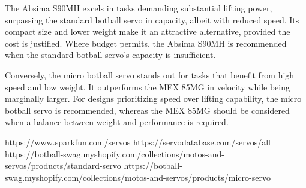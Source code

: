 \documentclass[conference]{IEEEtran}
\begin{document}
The Absima S90MH excels in tasks demanding substantial lifting power, surpassing the standard botball servo in capacity, albeit with reduced speed. Its compact size and lower weight make it an attractive alternative, provided the cost is justified. Where budget permits, the Absima S90MH is recommended when the standard botball servo's capacity is insufficient.

Conversely, the micro botball servo stands out for tasks that benefit from high speed and low weight. It outperforms the MEX 85MG in velocity while being marginally larger. For designs prioritizing speed over lifting capability, the micro botball servo is recommended, whereas the MEX 85MG should be considered when a balance between weight and performance is required.

\begin{thebibliography}{00}

 https://www.sparkfun.com/servos
 https://servodatabase.com/servos/all
 https://botball-swag.myshopify.com/collections/motos-and-servos/products/standard-servo
 https://botball-swag.myshopify.com/collections/motos-and-servos/products/micro-servo

\end{thebibliography}
\end{document}
